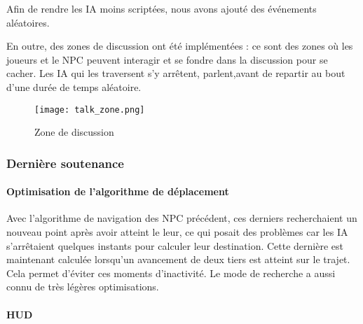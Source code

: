     
        Afin de rendre les IA moins scriptées, nous avons ajouté des événements aléatoires.
        
        En outre, des zones de discussion ont été implémentées : ce sont des zones où les joueurs et le NPC peuvent interagir 
        et se fondre dans la discussion pour se cacher. Les IA qui les traversent s'y arrêtent, parlent,avant de repartir au bout d'une durée 
        de temps aléatoire.

        \begin{figure}[hbt!]
            \centering
            \texttt{[image: talk\_zone.png]}
            \caption{Zone de discussion}
        \end{figure}
        \FloatBarrier


    \vspace{0.5cm}
    \subsubsection{Dernière soutenance}
    \vspace{0.5cm}

        \paragraph{Optimisation de l'algorithme de déplacement}

        Avec l'algorithme de navigation des NPC précédent, ces derniers recherchaient un nouveau point après avoir atteint 
        le leur, ce qui posait des problèmes car les IA s'arrêtaient quelques instants pour calculer leur destination. Cette dernière 
        est maintenant calculée lorsqu'un avancement de deux tiers est atteint sur le trajet. Cela permet d'éviter ces moments 
        d'inactivité. Le mode de recherche a aussi connu de très légères optimisations.

        \paragraph{HUD}


